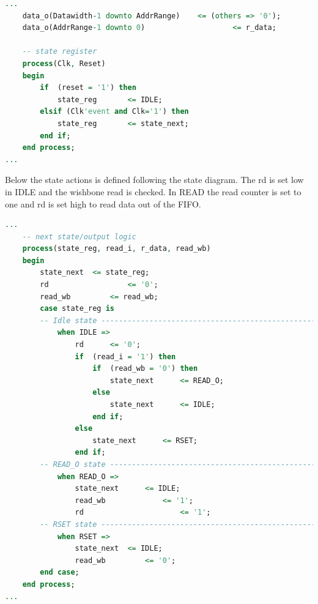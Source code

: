 \begin{lstlisting}[language=VHDL]
...
	data_o(Datawidth-1 downto AddrRange)	<= (others => '0');
	data_o(AddrRange-1 downto 0)					<= r_data;

	-- state register
	process(Clk, Reset)
	begin
		if	(reset = '1') then
			state_reg		<= IDLE;
		elsif (Clk'event and Clk='1') then
			state_reg		<= state_next;
		end if;
	end process;
...
\end{lstlisting}
Below the state actions is defined following the state diagram. The rd is set low in IDLE and the wishbone read is checked. In READ the read counter is set to one and rd is set high to read data out of the FIFO.
\begin{lstlisting}[language=VHDL]
...
	-- next state/output logic
	process(state_reg, read_i, r_data, read_wb)
	begin
		state_next	<= state_reg;
		rd					<= '0';
		read_wb			<= read_wb;
		case state_reg is
		-- Idle state -----------------------------------------------------
			when IDLE =>
				rd		<= '0';
				if	(read_i = '1') then
					if	(read_wb = '0') then
						state_next		<= READ_O;
					else
						state_next		<= IDLE;
					end if;
				else
					state_next		<= RSET;
				end if;
		-- READ_O state ---------------------------------------------------
			when READ_O =>
				state_next		<= IDLE;
				read_wb				<= '1';
				rd						<= '1';
		-- RSET state -----------------------------------------------------
			when RSET =>
				state_next	<= IDLE;
				read_wb			<= '0';
		end case;
	end process;
...
\end{lstlisting}


